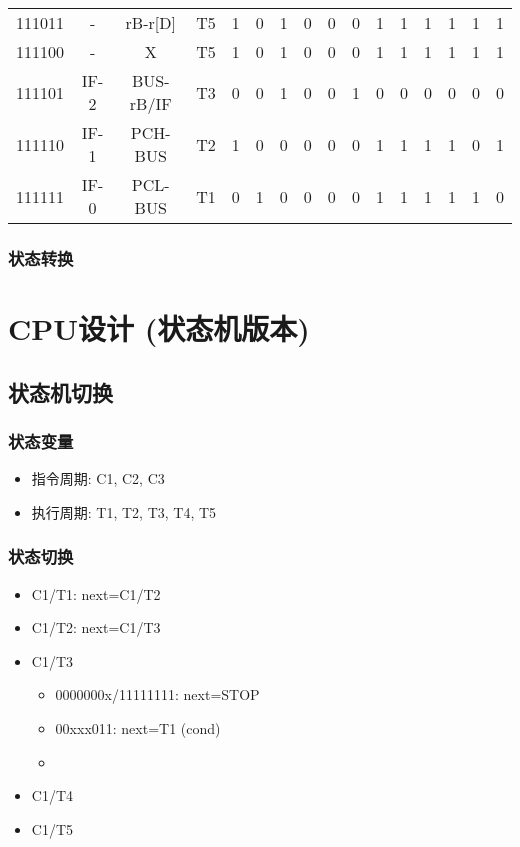 \documentclass[10pt]{book}
\begin{document}
\begin{longtable}{|c|c|c|c||c|c|c||c|c|c||c|c|c|c|c|c|}
111011 & - 		& rB-r[D]		& T5   & 1 & 0 & 1  & 0 & 0 & 0  & 1 & 1 & 1 & 1 & 1 & 1 \\
111100 & - 		& X 			& T5   & 1 & 0 & 1  & 0 & 0 & 0  & 1 & 1 & 1 & 1 & 1 & 1 \\
111101 & IF-2		& BUS-rB/IF	& T3   & 0 & 0 & 1  & 0 & 0 & 1  & 0 & 0 & 0 & 0 & 0 & 0 \\
111110 & IF-1		& PCH-BUS		& T2   & 1 & 0 & 0  & 0 & 0 & 0  & 1 & 1 & 1 & 1 & 0 & 1 \\
111111 & IF-0		& PCL-BUS		& T1   & 0 & 1 & 0  & 0 & 0 & 0  & 1 & 1 & 1 & 1 & 1 & 0 \\
\end{longtable}

\subsection{状态转换}



\chapter{CPU设计 (状态机版本)}
\section{状态机切换}
\subsection{状态变量}
\begin{itemize}
  \item 指令周期: C1, C2, C3
  \item 执行周期: T1, T2, T3, T4, T5
\end{itemize}

\subsection{状态切换}
\begin{itemize}
  \item C1/T1: next=C1/T2
  \item C1/T2: next=C1/T3
  \item C1/T3
  \begin{itemize}
    \item 0000000x/11111111: next=STOP
    \item 00xxx011: next=T1 (cond)
    \item 
  \end{itemize}
  \item C1/T4
  \item C1/T5
\end{itemize}
\end{document}
